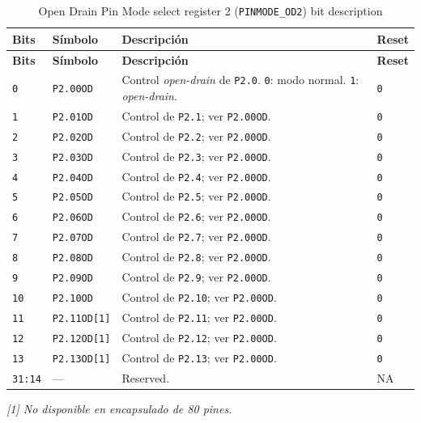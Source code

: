 \begin{longtable}{|>{\raggedright\arraybackslash}p{}|>{\raggedright\arraybackslash}p{}|>{\raggedright\arraybackslash}p{}|>{\centering\arraybackslash}p{}|}
\caption{Open Drain Pin Mode select register 2 (\texttt{PINMODE\_OD2}) bit description}\\
\hline
\textbf{Bits} & \textbf{Símbolo} & \textbf{Descripción} & \textbf{Reset} \\
\hline
\endfirsthead
\hline
\textbf{Bits} & \textbf{Símbolo} & \textbf{Descripción} & \textbf{Reset} \\
\hline
\endhead
\texttt{0} & \texttt{P2.00OD} & Control \textit{open-drain} de \texttt{P2.0}. \texttt{0}: modo normal. \texttt{1}: \textit{open-drain}. & \texttt{0} \\
\hline
\texttt{1} & \texttt{P2.01OD} & Control de \texttt{P2.1}; ver \texttt{P2.00OD}. & \texttt{0} \\
\hline
\texttt{2} & \texttt{P2.02OD} & Control de \texttt{P2.2}; ver \texttt{P2.00OD}. & \texttt{0} \\
\hline
\texttt{3} & \texttt{P2.03OD} & Control de \texttt{P2.3}; ver \texttt{P2.00OD}. & \texttt{0} \\
\hline
\texttt{4} & \texttt{P2.04OD} & Control de \texttt{P2.4}; ver \texttt{P2.00OD}. & \texttt{0} \\
\hline
\texttt{5} & \texttt{P2.05OD} & Control de \texttt{P2.5}; ver \texttt{P2.00OD}. & \texttt{0} \\
\hline
\texttt{6} & \texttt{P2.06OD} & Control de \texttt{P2.6}; ver \texttt{P2.00OD}. & \texttt{0} \\
\hline
\texttt{7} & \texttt{P2.07OD} & Control de \texttt{P2.7}; ver \texttt{P2.00OD}. & \texttt{0} \\
\hline
\texttt{8} & \texttt{P2.08OD} & Control de \texttt{P2.8}; ver \texttt{P2.00OD}. & \texttt{0} \\
\hline
\texttt{9} & \texttt{P2.09OD} & Control de \texttt{P2.9}; ver \texttt{P2.00OD}. & \texttt{0} \\
\hline
\texttt{10} & \texttt{P2.10OD} & Control de \texttt{P2.10}; ver \texttt{P2.00OD}. & \texttt{0} \\
\hline
\texttt{11} & \texttt{P2.11OD[1]} & Control de \texttt{P2.11}; ver \texttt{P2.00OD}. & \texttt{0} \\
\hline
\texttt{12} & \texttt{P2.12OD[1]} & Control de \texttt{P2.12}; ver \texttt{P2.00OD}. & \texttt{0} \\
\hline
\texttt{13} & \texttt{P2.13OD[1]} & Control de \texttt{P2.13}; ver \texttt{P2.00OD}. & \texttt{0} \\
\hline
\texttt{31:14} & --- & Reserved. & NA \\
\hline
\end{longtable}
\noindent\textit{[1] No disponible en encapsulado de 80 pines.}

